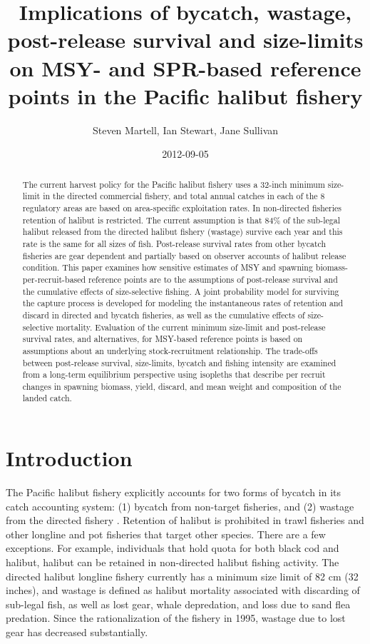 \documentclass[12pt,leqno]{article}
\title{Implications of bycatch, wastage, post-release survival and size-limits on MSY- and SPR-based reference points in the Pacific halibut fishery}
\author{ Steven Martell, Ian Stewart, Jane Sullivan }
\date{2012-09-05}
\begin{document}
\ifpdf
{}
\else
{}
\fi


\maketitle

\begin{abstract}
	The current harvest policy for the Pacific halibut fishery uses a 32-inch minimum size-limit in the directed commercial fishery, and total annual catches in each of the 8 regulatory areas are based on area-specific exploitation rates.  In non-directed fisheries retention of halibut is restricted. The current assumption is that 84\% of the sub-legal halibut released from the directed halibut fishery (wastage) survive each year and this rate is the same for all sizes of fish.  Post-release survival rates from other bycatch fisheries are gear dependent and partially based on observer accounts of halibut release condition.  This paper examines how sensitive estimates of MSY and spawning biomass-per-recruit-based reference points are to the assumptions of post-release survival and the cumulative effects of size-selective fishing.  A joint probability model for surviving the capture process is developed for modeling the instantaneous rates of retention and discard in directed and bycatch fisheries, as well as the cumulative effects of size-selective mortality.  Evaluation of the current minimum size-limit and post-release survival rates, and alternatives, for MSY-based reference points is based on assumptions about an underlying stock-recruitment relationship.  The trade-offs between post-release survival, size-limits, bycatch and fishing intensity are examined from a long-term equilibrium perspective using isopleths that describe per recruit changes in spawning biomass, yield, discard, and mean weight and composition of the landed catch.


\end{abstract}

\section*{Introduction}
The Pacific halibut fishery explicitly accounts for two forms of bycatch in its catch accounting system: (1) bycatch from non-target fisheries, and (2) wastage from the directed fishery \citep{gilroy2009wastage}.  Retention of halibut is prohibited in trawl fisheries and other longline and pot fisheries that target other species.  There are a few exceptions.  For example, individuals that hold quota for both black cod and halibut, halibut can be retained in non-directed halibut fishing activity.  The directed halibut longline fishery currently has a minimum size limit of 82 cm (32 inches), and wastage is defined as halibut mortality associated with discarding of sub-legal fish, as well as  lost gear, whale depredation, and loss due to sand flea predation.  Since the rationalization of the fishery in 1995, wastage due to lost gear has decreased substantially.  
\end{document}
